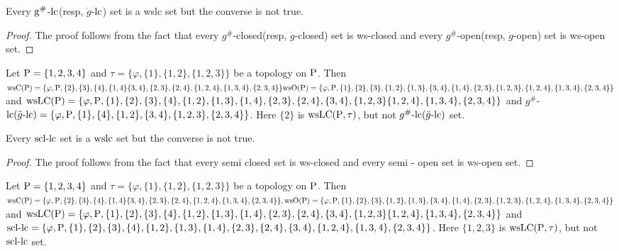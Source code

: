 \begin{thm}\label{thm6.2.16}
Every $\mathrm{g}^{\text{\#}}$-$\mathrm{lc}$(resp, $\ddot{g}$-$\mathrm{lc}$) set is a wslc set but the converse is not true.

\end{thm}

\begin{proof}
The proof follows from the fact that every $g^{\text{\#}}$-closed(resp, $\ddot{g}$-closed) set is ws-closed and every $g^{\text{\#}}$-open(resp, $\ddot{g}$-open) set is ws-open set.
\end{proof}

\begin{exm}\label{exam6.2.17}
Let $\mathrm{P} = \{1, 2, 3, 4\}$ and $\tau = \{\varphi, \{1\}, \{1, 2\}, \{1, 2, 3\}\}$ be a topology on $\mathrm{P}$. Then $\mathrm{ws}\mathrm{C}(\mathrm{P}) = \{\varphi, \mathrm{P}, \{2\}, \{3\}, \{4\},\{1, 4\} \{3,4\}, \{2,3\}, \{2,4\},\{1,2,4\},\{1,3,4\},\{2,3,4\}\} \mathrm{ws}\mathrm{O}(\mathrm{P}) = \{\varphi, \mathrm{P}, \{1\}, \{2\}, \{3\},\{1,2\}, \{1,3\},\{3,4\}, \{1,4\}, \{2,3\}, \{1,2,3\}, \{1,2,4\},\{1,3,4\},\{2,3,4\}\}$ and $\mathrm{ws}\mathrm{L}\mathrm{C}(\mathrm{P})= \{\varphi, \mathrm{P},\{1\}, \{2\}, \{3\},\{4\},\{1,2\},\{1,3\}, \{1,4\},\{2,3\}, \{2,4\},\{3,4\}, \{1, 2, 3\}\{1,2,4\},\{1,3,4\},\{2,3,4\}\}$ and $g^{\text{\#}}$-$\mathrm{lc}(\ddot{g}\text{-}\mathrm{lc}) = \{\varphi,\mathrm{P},\{1\},\{4\},\{1,2\},\{3, 4\},\{1,2,3\},\{2,3,4\}\}$. Here $\{2\}$ is $\mathrm{ws}\mathrm{LC}(\mathrm{P}, \tau)$, but not $g^{\text{\#}}\text{-}\mathrm{lc}(\ddot{g}\text{-}\mathrm{lc})$ set.
\end{exm}

\begin{thm}\label{add-thm6.2.16}
Every $\mathrm{scl}\text{-}\mathrm{lc}$ set is a $\mathrm{wslc}$ set but the converse is not true.
\end{thm}

\begin{proof}
The proof follows from the fact that every semi closed set is ws-closed and every semi - open set is ws-open set.
\end{proof}

\begin{exm}\label{add-exam6.2.17}
Let $\mathrm{P} = \{1, 2, 3, 4\}$ and $\tau = \{\varphi, \{1\}, \{1, 2\}, \{1, 2, 3\}\}$ be a topology on $\mathrm{P}$. Then $\mathrm{ws}\mathrm{C}(\mathrm{P}) = \{\varphi, \mathrm{P}, \{2\}, \{3\}, \{4\},\{1, 4\} \{3,4\}, \{2,3\}, \{2,4\},\{1,2, 4\},\{1,3,4\},\{2,3,4\}\}, \mathrm{ws}\mathrm{O}(\mathrm{P}) = \{\varphi, \mathrm{P}, \{1\}, \{2\}, \{3\},\{1,2\}, \{1,3\},\{3,4\}, \{1,4\},\{2,3\},\{1,2, 3\},\{1,2,4\},\{1,3,4\},\{2,3,4\}\}$ and $\mathrm{ws}\mathrm{LC}(\mathrm{P})= \{\varphi, \mathrm{P},\{1\}, \{2\}, \{3\},\{4\},\{1,2\},\{1,3\}, \{1,4\},\{2,3\}, \{2,4\},\{3,4\}, \{1, 2, 3\}\{1,2,4\},\{1,3,4\},\{2,3,4\}\}$ and $\mathrm{scl}\text{-}\mathrm{lc}= \{ \varphi, \mathrm{P} ,\{1\}, \{2\},\{3\},\{4\},\{1,2\},\{1,3\}, \{1,4\}, \{2,3\}, \{2,4\},\{3,4\},\{1,2,4\},\{1,3,4\},\{2,3,4\}\}$. Here $\{1,2,3\}$ is $\mathrm{ws}\mathrm{LC} (\mathrm{P}, \tau)$, but not $\mathrm{scl}\text{-}\mathrm{lc}$ set.
\end{exm}

